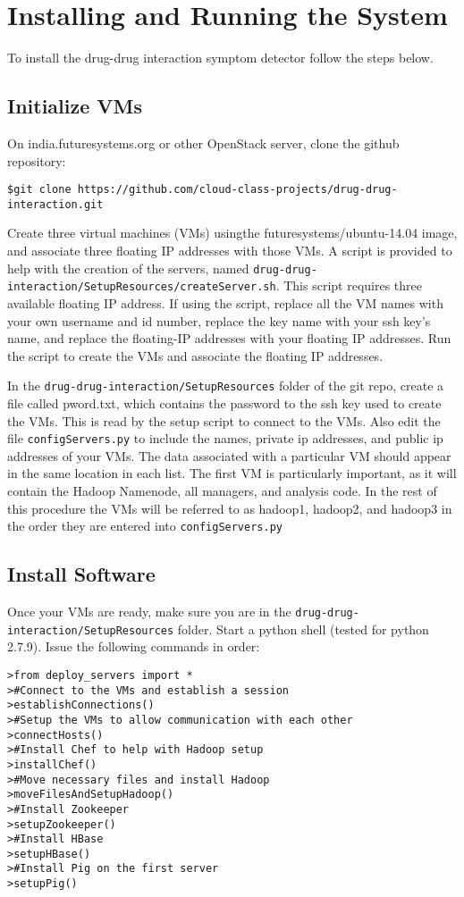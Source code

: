 \documentclass[letterpaper]{article}
\begin{document}
\section{Installing and Running the System}

To install the drug-drug interaction symptom detector follow the steps below.

\subsection{Initialize VMs} 
On india.futuresystems.org or other OpenStack server, clone the github repository: \
\begin{lstlisting}
$git clone https://github.com/cloud-class-projects/drug-drug-interaction.git
\end{lstlisting}

Create three virtual machines (VMs) usingthe futuresystems/ubuntu-14.04 image, and associate three floating IP addresses with those VMs. A script is provided to help with the creation of the servers, named \lstinline|drug-drug-interaction/SetupResources/createServer.sh|. This script requires three available floating IP address. If using the script, replace all the VM names with your own username and id number, replace the key name with your ssh key's name, and replace the floating-IP addresses with your floating IP addresses. Run the script to create the VMs and associate the floating IP addresses.

In the \lstinline|drug-drug-interaction/SetupResources| folder of the git repo, create a file called pword.txt, which contains the password to the ssh key used to create the VMs. This is read by the setup script to connect to the VMs. Also edit the file \lstinline|configServers.py| to include the names, private ip addresses, and public ip addresses of your VMs. The data associated with a particular VM should appear in the same location in each list. The first VM is particularly important, as it will contain the Hadoop Namenode, all managers, and analysis code. In the rest of this procedure the VMs will be referred to as hadoop1, hadoop2, and hadoop3 in the order they are entered into \lstinline|configServers.py|

\subsection{Install Software}

Once your VMs are ready, make sure you are in the \lstinline|drug-drug-interaction/SetupResources| folder. Start a python shell (tested for python 2.7.9). Issue the following commands in order:
\begin{lstlisting}
>from deploy_servers import *
>#Connect to the VMs and establish a session
>establishConnections()
>#Setup the VMs to allow communication with each other
>connectHosts()
>#Install Chef to help with Hadoop setup
>installChef()
>#Move necessary files and install Hadoop
>moveFilesAndSetupHadoop()
>#Install Zookeeper
>setupZookeeper()
>#Install HBase
>setupHBase()
>#Install Pig on the first server
>setupPig()
\end{lstlisting}
\end{document}
